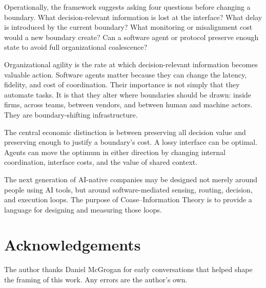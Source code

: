 \documentclass[11pt]{article}
\begin{document}
Operationally, the framework suggests asking four questions before changing a
boundary. What decision-relevant information is lost at the interface? What
delay is introduced by the current boundary? What monitoring or misalignment
cost would a new boundary create? Can a software agent or protocol preserve
enough state to avoid full organizational coalescence?

Organizational agility is the rate at which decision-relevant information
becomes valuable action. Software agents matter because they can change the
latency, fidelity, and cost of coordination. Their importance is not simply
that they automate tasks. It is that they alter where boundaries should be
drawn: inside firms, across teams, between vendors, and between human and
machine actors. They are boundary-shifting infrastructure.

The central economic distinction is between preserving all decision value
and preserving enough to justify a boundary's cost. A lossy interface can be
optimal. Agents can move the optimum in either direction by changing internal
coordination, interface costs, and the value of shared context.

The next generation of AI-native companies may be designed not merely around
people using AI tools, but around software-mediated sensing, routing, decision,
and execution loops. The purpose of Coase--Information Theory is to provide a
language for designing and measuring those loops.

\section*{Acknowledgements}

The author thanks Daniel McGrogan for early conversations that helped shape the
framing of this work. Any errors are the author's own.
\end{document}
